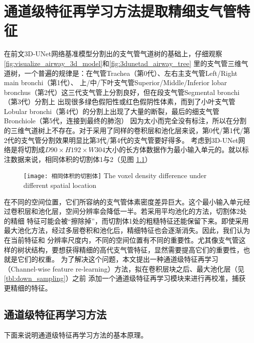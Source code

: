 
\chapter{通道级特征再学习方法提取精细支气管特征}\label{chap:feature_relearning}

在前文3D-UNet网络基准模型分割出的支气管气道树的基础上，仔细观察\autoref{fig:visualize_airway_3d_model}和\autoref{fig:3dunetad_airway_tree}
里的支气管三维气道树，一个普遍的规律是：在气管Trachea（第0代）、左右主支气管Left/Right main bronchi（第1代）、
上/中/下叶支气管Superior/Middle/Inferior lobar bronchus（第2代）这三代支气管上分割良好，但在段支气管Segmental bronchi（第3代）分割上
出现很多绿色假阳性或红色假阴性体素，而到了小叶支气管Lobular bronchi（第4代）的分割上出现了大量的断裂，最后的细支气管Bronchiole（第5代，连接到最终的肺泡）
因为太小而完全没有标注，所以在分割的三维气道树上不存在。对于采用了同样的卷积层和池化层来说，第0代/第1代/第2代的支气管分割效果明显比第3代/第4代的支气管要好得多。
考虑到3D-UNet网络是将切割成$D90 \times H192 \times W304$大小的长方体数据作为最小输入单元的。就以标注数据来说，相同体积的切割体1与2（见图
\ref{fig:voxel_density_diffs}）
\begin{figure}[h]
    \centering
    \texttt{[image: 相同体积的切割体]}
        {The voxel density difference under different spatial location}
    \label{fig:voxel_density_diffs}
\end{figure}
在不同的空间位置，它们所容纳的支气管体素密度差异巨大。这个最小输入单元经过卷积层和池化层，空间分辨率会降低一半。若采用平均池化的方法，切割体2处的精细
特征可能会被“擦除掉”，而切割体1处的粗糙特征还能保留下来。即使采用最大池化方法，经过多层卷积和池化后，精细特征也会逐渐消失。因此，我们认为在当前特征和
分辨率尺度内，不同的空间位置有不同的重要性。尤其像支气管这样的树状结构，要想获得精细的高代支气管特征，显然需要提高它们的重要性，也就是它们的权重。
为了解决这个问题，本文提出一种通道级特征再学习（Channel-wise feature re-learning）方法，拟在卷积层块之后、最大池化层（见\autoref{tbl:down_sampling}）之前
添加一个通道级特征再学习模块来进行再校准，捕获更精细的特征。

\section{通道级特征再学习方法}
下面来说明通道级特征再学习方法的基本原理。

